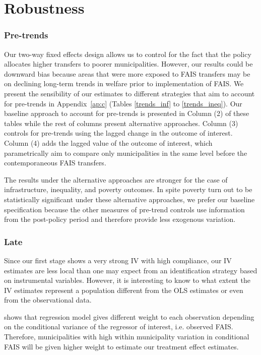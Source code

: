 \documentclass[dv_diss_main.tex]{subfiles}
\begin{document}
\section{Robustness}\label{sec: Robustness}

\subsubsection{Pre-trends} Our two-way fixed effects design allows us to control for the fact that the policy allocates higher transfers to poorer municipalities. However, our results could be downward bias because areas that were more exposed to FAIS transfers may be on declining long-term trends in welfare prior to implementation of FAIS. We present the sensibility of our estimates to different strategies that aim to account for pre-trends in Appendix~\ref{ap:c} (Tables \ref{trends_inf} to \ref{trends_ineq}). Our baseline approach to account for pre-trends is presented in Column (2) of these tables while the rest of columns present alternative approaches. Column (3) controls for pre-trends using the lagged change in the outcome of interest. Column (4) adds the lagged value of the outcome of interest, which parametrically aim to compare only municipalities in the same level before the contemporaneous FAIS transfers. 

The results under the alternative approaches are stronger for the case of infrastructure, inequality, and poverty outcomes. In spite poverty turn out to be statistically significant under these alternative approaches, we prefer our baseline specification because the other measures of pre-trend controls use information from the post-policy period and therefore provide less exogenous variation.

\subsubsection{Late} Since our first stage shows a very strong IV with high compliance, our IV estimates are less local than one may expect from an identification strategy based on instrumental variables. However, it is interesting to know to what extent the IV estimates represent a population different from the OLS estimates or even from the observational data.

 \cite{aronow2016does} shows that regression model gives different weight to each observation depending on the conditional variance of the regressor of interest, i.e. observed FAIS. Therefore, municipalities with high within municipality variation in conditional FAIS will be given higher weight to estimate our treatment effect estimates. 
\end{document}
